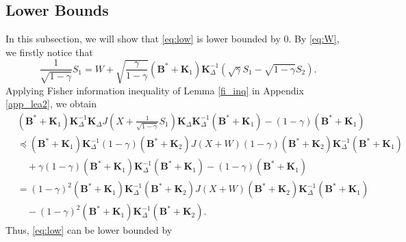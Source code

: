 \documentclass[journal,final, onecolumn]{IEEEtran}
\begin{document}
\subsection{Lower Bounds}
In this subsection, we will show that \eqref{eq:low} is lower bounded by $0$. By \eqref{eq:W}, we firstly notice that
\begin{equation}
\frac{1}{\sqrt{1-\gamma}} S_1 = W+\sqrt{\frac{\gamma}{1-\gamma}} (\boldsymbol{B}^{*} + \boldsymbol{K}_{1}) \boldsymbol{K}_{\Delta}^{-1}\left(    \sqrt{\gamma}S_{1} - \sqrt{1-\gamma}S_{2}  \right).
\end{equation}
Applying Fisher information inequality of Lemma \ref{fi_inq} in Appendix \ref{app_lea2}, we obtain
\begin{align}
&{(\boldsymbol{B}^{*}+\boldsymbol{K}_{1})}\boldsymbol{K}^{-1}_{\Delta} \boldsymbol{K}_{\Delta}       J\left(X+\frac{1}{\sqrt{1-\gamma}}S_{1}\right) \boldsymbol{K}_{\Delta}\boldsymbol{K}^{-1}_{\Delta} {(\boldsymbol{B}^{*}+\boldsymbol{K}_{1})} - {(1-\gamma)} (\boldsymbol{B}^{*}+\boldsymbol{K}_{1})            \nonumber \\
& \preceq      (\boldsymbol{B}^{*} + \boldsymbol{K}_{1}) \boldsymbol{K}^{-1}_{\Delta}(1-\gamma)(\boldsymbol{B}^{*} + \boldsymbol{K}_{2}) J(X+W)(1-\gamma)(\boldsymbol{B}^{*} + \boldsymbol{K}_{2}) \boldsymbol{K}^{-1}_{\Delta}(\boldsymbol{B}^{*} + \boldsymbol{K}_{1}) \nonumber \\
& \quad +\gamma (1-\gamma)(\boldsymbol{B}^{*} + \boldsymbol{K}_{1}) \boldsymbol{K}^{-1}_{\Delta} (\boldsymbol{B}^{*} + \boldsymbol{K}_{1})- {(1-\gamma)} (\boldsymbol{B}^{*}+\boldsymbol{K}_{1})\\
& =   (1-\gamma)^{2}    (\boldsymbol{B}^{*} + \boldsymbol{K}_{1}) \boldsymbol{K}^{-1}_{\Delta}(\boldsymbol{B}^{*} + \boldsymbol{K}_{2}) J(X+W)(\boldsymbol{B}^{*} + \boldsymbol{K}_{2}) \boldsymbol{K}^{-1}_{\Delta}(\boldsymbol{B}^{*} + \boldsymbol{K}_{1})\nonumber \\ &\quad-(1-\gamma)^{2}(\boldsymbol{B}^{*} + \boldsymbol{K}_{1}) \boldsymbol{K}^{-1}_{\Delta}(\boldsymbol{B}^{*} + \boldsymbol{K}_{2}).
\end{align}
Thus, \eqref{eq:low} can be lower bounded by
\end{document}
